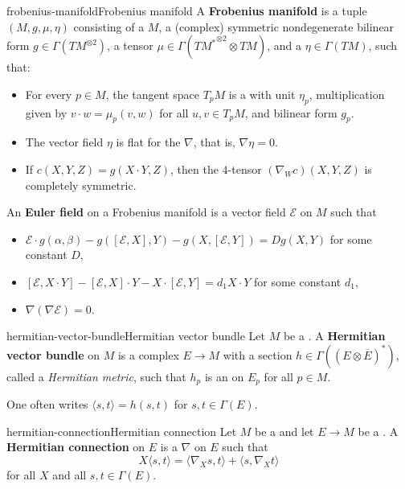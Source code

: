 \begin{topic}{frobenius-manifold}{Frobenius manifold}
    A \textbf{Frobenius manifold} is a tuple $(M, g, \mu, \eta)$ consisting of a  $M$, a (complex) symmetric nondegenerate bilinear form $g \in \Gamma(TM^{\otimes 2})$, a tensor $\mu \in \Gamma({TM^*}^{\otimes 2} \otimes TM)$, and a  $\eta \in \Gamma(TM)$, such that:
    \begin{itemize}
        \item For every $p \in M$, the tangent space $T_p M$ is a  with unit $\eta_p$, multiplication given by $v \cdot w = \mu_p(v, w)$ for all $u, v \in T_p M$, and bilinear form $g_p$.
        \item The vector field $\eta$ is flat for the  $\nabla$, that is, $\nabla \eta = 0$.
        \item If $c(X, Y, Z) = g(X \cdot Y, Z)$, then the $4$-tensor $(\nabla_W c)(X, Y, Z)$ is completely symmetric.
    \end{itemize}
    An \textbf{Euler field} on a Frobenius manifold is a vector field $\mathcal{E}$ on $M$ such that
    \begin{itemize}
        \item $\mathcal{E} \cdot g(\alpha, \beta) - g([\mathcal{E}, X], Y) - g(X, [\mathcal{E}, Y]) = D g(X, Y)$ for some constant $D$,
        \item $[\mathcal{E}, X \cdot Y] - [\mathcal{E}, X] \cdot Y - X \cdot [\mathcal{E}, Y] = d_1 X \cdot Y$ for some constant $d_1$,
        \item $\nabla (\nabla \mathcal{E}) = 0$.
    \end{itemize}
\end{topic}

\begin{topic}{hermitian-vector-bundle}{Hermitian vector bundle}
    Let $M$ be a . A \textbf{Hermitian vector bundle} on $M$ is a complex  $E \to M$ with a section $h \in \Gamma((E \otimes \overline{E})^*)$, called a \textit{Hermitian metric}, such that $h_p$ is an  on $E_p$ for all $p \in M$.

    One often writes $\langle s, t \rangle = h(s, t)$ for $s, t \in \Gamma(E)$.
\end{topic}

\begin{topic}{hermitian-connection}{Hermitian connection}
    Let $M$ be a  and let $E \to M$ be a . A \textbf{Hermitian connection} on $E$ is a  $\nabla$ on $E$ such that
    \[ X \langle s, t \rangle = \langle \nabla_X s, t \rangle + \langle s, \nabla_X t \rangle \]
    for all  $X$ and all $s, t \in \Gamma(E)$.
\end{topic}

